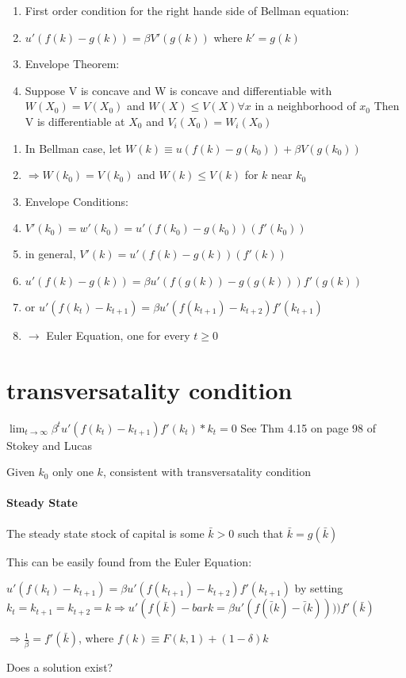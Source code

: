 \documentclass{article}
\begin{document}
\begin{enumerate}
    \item First order condition for the right hande side of Bellman equation:
    \item $u'(f(k) - g(k)) = \beta V'(g(k))$ where $k' = g(k)$
    \item Envelope Theorem:
    \item Suppose V is concave and W is concave and differentiable with
    $W(X_0) = V(X_0)$ and $W(X) \leq V(X) \forall x$ in a neighborhood of $x_0$
    Then V is differentiable at $X_0$ and $V_i(X_0) = W_i(X_0)$

\end{enumerate}


\begin{enumerate}
    \item In Bellman case, let $W(k) \equiv u(f(k) - g(k_0)) + \beta V(g(k_0))$
    \item $\Rightarrow W(k_0) = V(k_0)$ and $W(k) \leq V(k)$ for $k$ near $k_0$
    \item Envelope Conditions:
    \item $V'(k_0) = w'(k_0) = u'(f(k_0) - g(k_0))(f'(k_0))$
    \item in general, $V'(k) = u'(f(k) - g(k))(f'(k))$
    \item $u'(f(k) - g(k)) = \beta u'(f(g(k)) - g(g(k)))f'(g(k))$
    \item or $u'(f(k_t)-k_{t+1}) = \beta u'(f(k_{t+1}) - k_{t+2})f'(k_{t+1})$
    \item $\rightarrow$ Euler Equation, one for every $t \geq 0$
\end{enumerate}

\section{transversatality condition}
$\lim_{t \to \infty} \beta^t u'(f(k_t) - k_{t+1})f'(k_t)*k_t = 0$
See Thm 4.15 on page 98 of Stokey and Lucas

Given $k_0$ only one $k$, consistent with transversatality condition

\paragraph{Steady State}
{The steady state stock of capital is some $\bar{k}>0$} such that $\bar{k} = g(\bar{k})$

This can be easily found from the Euler Equation:

$ u'(f(k_t) - k_{t+1}) = \beta u'(f(k_{t+1}) - k_{t+2})f'(k_{t+1})$ by
 setting $k_t = k_{t+1} = k_{t+2} = k \Rightarrow u'(f(\bar{k})-bar{k} = 
 \beta u'(f(\bar(k)-\bar(k))))f'(\bar{k})$

 $\Rightarrow \frac{1}{\beta} = f'(\bar{k})$, where $f(k) \equiv
    F(k,1) + (1-\delta)k$

Does a solution exist?
\end{document}
